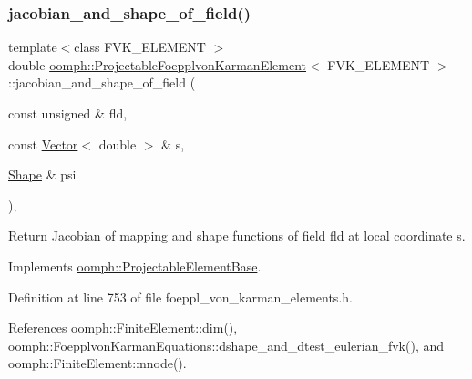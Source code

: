 \mbox{\label{classoomph_1_1ProjectableFoepplvonKarmanElement_a1fd58ba72daf96c1849cb48350684d74}} 
\subsubsection{\texorpdfstring{jacobian\+\_\+and\+\_\+shape\+\_\+of\+\_\+field()}{jacobian\_and\_shape\_of\_field()}}
{\footnotesize\ttfamily template$<$class F\+V\+K\+\_\+\+E\+L\+E\+M\+E\+NT $>$ \\
double \hyperlink{classoomph_1_1ProjectableFoepplvonKarmanElement}{oomph\+::\+Projectable\+Foepplvon\+Karman\+Element}$<$ F\+V\+K\+\_\+\+E\+L\+E\+M\+E\+NT $>$\+::jacobian\+\_\+and\+\_\+shape\+\_\+of\+\_\+field (\begin{DoxyParamCaption}\item[{const unsigned \&}]{fld,  }\item[{const \hyperlink{classoomph_1_1Vector}{Vector}$<$ double $>$ \&}]{s,  }\item[{\hyperlink{classoomph_1_1Shape}{Shape} \&}]{psi }\end{DoxyParamCaption})\hspace{0.3cm}{\ttfamily [inline]}, {\ttfamily [virtual]}}



Return Jacobian of mapping and shape functions of field fld at local coordinate s. 



Implements \hyperlink{classoomph_1_1ProjectableElementBase_ad45c21b58c0985d52f68ab2d79cbb488}{oomph\+::\+Projectable\+Element\+Base}.



Definition at line 753 of file foeppl\+\_\+von\+\_\+karman\+\_\+elements.\+h.



References oomph\+::\+Finite\+Element\+::dim(), oomph\+::\+Foepplvon\+Karman\+Equations\+::dshape\+\_\+and\+\_\+dtest\+\_\+eulerian\+\_\+fvk(), and oomph\+::\+Finite\+Element\+::nnode().

\mbox{\label{classoomph_1_1ProjectableFoepplvonKarmanElement_ad4d911152c2f5e648f7f6558e53d4c9b}} 
